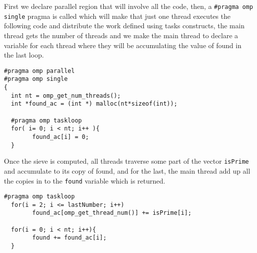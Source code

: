 \justify
First we declare parallel region that will involve all the code, then, a \texttt{\#pragma omp single} pragma is called which will make that just one thread executes the following code and distribute the work defined using tasks constructs, the main thread gets the number of threads and we make the main thread to declare a variable for each thread where they will be accumulating the value of found in the last loop.

\begin{lstlisting}[caption={Main structure for task based model}, captionpos=b]
#pragma omp parallel
#pragma omp single
{
  int nt = omp_get_num_threads();
  int *found_ac = (int *) malloc(nt*sizeof(int));

  #pragma omp taskloop
  for( i= 0; i < nt; i++ ){
        found_ac[i] = 0;
  }

\end{lstlisting}

Once the sieve is computed, all threads traverse some part of the vector \texttt{isPrime} and accumulate to its copy of found, and for the last, the main thread add up all the copies in to the \texttt{found} variable which is returned.

\begin{lstlisting}[caption={Manual reduction implementation}, captionpos=b]
  #pragma omp taskloop
  for(i = 2; i <= lastNumber; i++)
        found_ac[omp_get_thread_num()] += isPrime[i];

  for(i = 0; i < nt; i++){
        found += found_ac[i];
  }
\end{lstlisting}




